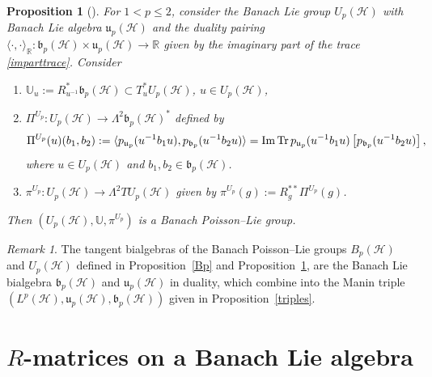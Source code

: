 \documentclass[a4paper,12pt,reqno]{amsart}%
\newtheorem{proposition}[theorem]{Proposition}
\theoremstyle{definition}
\theoremstyle{remark}
\newtheorem{remark}[theorem]{Remark}
\numberwithin{theorem}{section}
\numberwithin{equation}{section}
\newcommand{\1}{{\bf 1}}
\DeclareMathOperator{\Tr}{\textnormal{Tr}}
\DeclareMathOperator{\im}{\textnormal{Im}}
\begin{document}
\begin{proposition}[{\cite[Proposition~5.10]{tumpach-bruhat}}]\label{Up}
For $1<p\leq 2$, consider the Banach Lie group  $ {U}_{p}(\mathcal{H})$ with Banach Lie algebra $\mathfrak{u}_p(\mathcal{H})$ and the duality pairing $\langle\cdot,\cdot\rangle_{\mathbb{R}}: \mathfrak{b}_p(\mathcal{H})\times \mathfrak{u}_p(\mathcal{H})\rightarrow \mathbb{R}$ given by the imaginary part of the trace \eqref{imparttrace}. Consider
\begin{enumerate}
\item
$\mathbb{U}_u:= R_{u^{-1}}^*\mathfrak{b}_p(\mathcal{H})\subset T_u^*{U}_{p}(\mathcal{H})$, $u\in {U}_{p}(\mathcal{H})$,
\item $\Pi^{ {U}_{p}}: {U}_{p}(\mathcal{H})\rightarrow \Lambda^2\mathfrak{b}_p(\mathcal{H})^*$ defined by
\begin{equation}\label{PiUp}
\Pi^{ {U}_{p}}(u)(b_1, b_2) := \langle  p_{\mathfrak{u}_p}(u^{-1}b_1u), p_{\mathfrak{b}_p}(u^{-1}b_2 u) \rangle = \im\Tr p_{\mathfrak{u}_p}(u^{-1}b_1u)\left[ p_{\mathfrak{b}_p}(u^{-1}b_2 u)\right],
\end{equation}
where $u \in {U}_{p}(\mathcal{H})$ and $b_1, b_2\in \mathfrak{b}_p(\mathcal{H})$.
\item $\pi^{{U}_{p}}: {U}_{p}(\mathcal{H})\rightarrow \Lambda^2 T{U}_{p}(\mathcal{H})$ given by $\pi^{{U}_{p}}(g) := R_{g}^{**}\Pi^{ {U}_{p}}(g)$.
\end{enumerate}
Then $({U}_{p}(\mathcal{H}), \mathbb{U}, \pi^{{U}_{p}})$ is a Banach Poisson--Lie group. 
\end{proposition}


\begin{remark}
    The tangent bialgebras of the Banach Poisson--Lie groups ${B}_{p}(\mathcal{H})$ and $ {U}_{p}(\mathcal{H})$ defined in Proposition~\ref{Bp} and Proposition~\ref{Up}, are the Banach Lie bialgebra $\mathfrak{b}_p(\mathcal{H})$ and $\mathfrak{u}_p(\mathcal{H})$ in duality, which combine into the Manin triple $(L^p(\mathcal{H}), \mathfrak{u}_{p}(\mathcal{H}), \mathfrak{b}_p(\mathcal{H}))$ given in Proposition~\ref{triples}.
\end{remark}




\section{\texorpdfstring{$R$-matrices on a Banach Lie algebra}{R-matrices on a Banach Lie algebra}}\label{sec:R}
\end{document}
